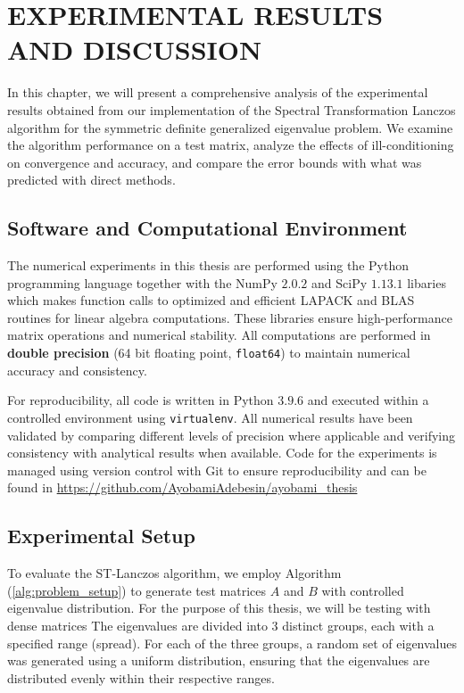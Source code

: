 \chapter{EXPERIMENTAL RESULTS AND DISCUSSION}
In this chapter, we will present a comprehensive analysis of the experimental results obtained from our implementation of the Spectral Transformation Lanczos algorithm for the symmetric definite generalized eigenvalue problem. We examine the algorithm performance on a test matrix, analyze the effects of ill-conditioning on convergence and accuracy, and compare the error bounds with what was predicted with direct methods.

\section{Software and Computational Environment}
The numerical experiments in this thesis are performed using the Python programming language together with the NumPy $2.0.2$ and SciPy $1.13.1$ libaries which makes function calls to optimized and efficient LAPACK and BLAS routines for linear algebra computations. These libraries ensure high-performance matrix operations and numerical stability. All computations are performed in \textbf{double precision} (64 bit floating point, \texttt{float64}) to maintain numerical accuracy and consistency.

For reproducibility, all code is written in Python $3.9.6$ and executed within a controlled environment using \texttt{virtualenv}. All numerical results have been validated by comparing different levels of precision where applicable and verifying consistency with analytical results when available. Code for the experiments is managed using version control with Git to ensure reproducibility and can be found in \href{https://github.com/AyobamiAdebesin/ayobami_thesis}{https://github.com/AyobamiAdebesin/ayobami\_thesis}

\section{Experimental Setup}
To evaluate the ST-Lanczos algorithm, we employ Algorithm (\ref{alg:problem_setup}) to generate test matrices $A$ and $B$ with controlled eigenvalue distribution. For the purpose of this thesis, we will be testing with dense matrices The eigenvalues are divided into 3 distinct groups, each with a specified range (spread). For each of the three groups, a random set of eigenvalues was generated using a uniform distribution, ensuring that the eigenvalues are distributed evenly within their respective ranges.

